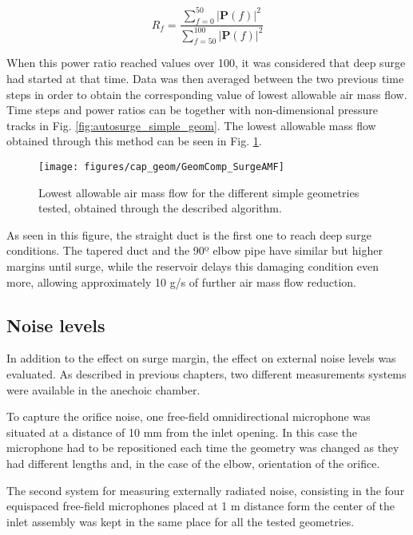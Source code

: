 \begin{equation}
	R_f=\frac{\sum_{f=0}^{50}|\mathbf{P}(f)|^2}{\sum_{f=50}^{100}|\mathbf{P}(f)|^2}
\end{equation}

When this power ratio reached values over 100, it was considered that deep surge had started at that time. Data was then averaged between the two previous time steps in order to obtain the corresponding value of lowest allowable air mass flow. Time steps and power ratios can be together with non-dimensional pressure tracks in Fig. \ref{fig:autosurge_simple_geom}. The lowest allowable mass flow obtained through this method can be seen in Fig. \ref{fig:minFlow_simple_geom}.

\begin{figure}[htb!]
\centering
\texttt{[image: figures/cap\_geom/GeomComp\_SurgeAMF]}
\caption[Lowest allowable $\dot m^*$ for the different geometries]{Lowest allowable air mass flow for the different simple geometries tested, obtained through the described algorithm.}
\label{fig:minFlow_simple_geom}
\end{figure}

As seen in this figure, the straight duct is the first one to reach  deep surge conditions. The tapered duct and the 90º elbow pipe have similar but higher margins until surge, while the reservoir delays this damaging condition even more, allowing approximately 10 g/s of further air mass flow reduction.

\subsection{Noise levels}

In addition to the effect on surge margin, the effect on external noise levels was evaluated. As described in previous chapters, two different measurements systems were available in the anechoic chamber. 

To capture the orifice noise, one free-field omnidirectional microphone was situated at a distance of 10 mm from the inlet opening. In this case the microphone had to be repositioned each time the geometry was changed as they had different lengths and, in the case of the elbow, orientation of the orifice.

The second system for measuring externally radiated noise, consisting in the four equispaced free-field microphones placed at 1 m distance form the center of the inlet assembly was kept in the same place for all the tested geometries. 

